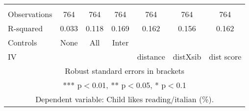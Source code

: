 \begin{tabular}{lcccccc}
 &  &  &  &  &  &  \\
Observations & 764 & 764 & 764 & 764 & 764 & 764 \\
R-squared & 0.033 & 0.118 & 0.169 & 0.162 & 0.156 & 0.162 \\
Controls & None & All & Inter &  &  &  \\
 IV &  &  &  & distance & distXsib & dist score \\ \hline
\multicolumn{7}{c}{ Robust standard errors in brackets} \\
\multicolumn{7}{c}{ *** p$<$0.01, ** p$<$0.05, * p$<$0.1} \\
\multicolumn{7}{c}{ Dependent variable: Child likes reading/italian (\%).} \\
\end{tabular}
